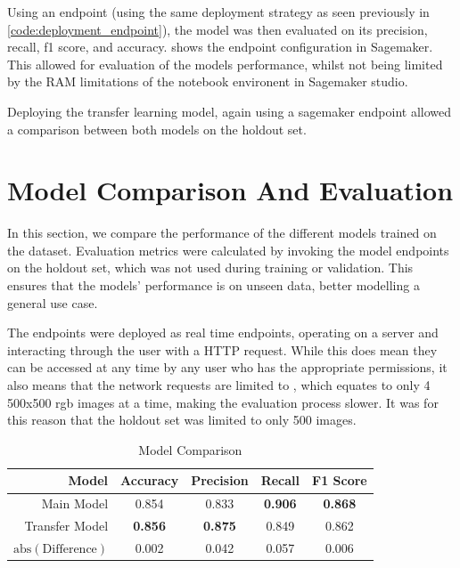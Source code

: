 Using an endpoint (using the same deployment strategy as seen previously in \cref{code:deployment_endpoint}), the model was then evaluated on its precision, recall, f1 score, and accuracy.  shows the endpoint configuration in Sagemaker. This allowed for evaluation of the models performance, whilst not being limited by the RAM limitations of the notebook environent in Sagemaker studio. 

Deploying the transfer learning model, again using a sagemaker endpoint allowed a comparison between both models on the holdout set.

\newpage

\section{Model Comparison And Evaluation}

In this section, we compare the performance of the different models trained on the dataset. Evaluation metrics were calculated by invoking the model endpoints on the holdout set, which was not used during training or validation. This ensures that the models' performance is on unseen data, better modelling a general use case.

The endpoints were deployed as real time endpoints, operating on a server and interacting through the user with a HTTP request. While this does mean they can be accessed at any time by any user who has the appropriate permissions, it also means that the network requests are limited to , which equates to only 4 500x500 rgb images at a time, making the evaluation process slower. It was for this reason that the holdout set was limited to only 500 images.

\begin{table}[h]
\centering
\caption{Model Comparison}
\begin{tabular}{rcccc}
\toprule
\textbf{Model} & \textbf{Accuracy} & \textbf{Precision} & \textbf{Recall} & \textbf{F1 Score} \\
\midrule
Main Model     & 0.854          & 0.833          & \textbf{0.906} & \textbf{0.868} \\
Transfer Model & \textbf{0.856} & \textbf{0.875} & 0.849 & 0.862 \\
\midrule
$\text{abs}(\text{Difference}) $ & 0.002 & 0.042 & 0.057 & 0.006 \\
\bottomrule
\end{tabular}
\label{tab:model_comparison}
\end{table}

